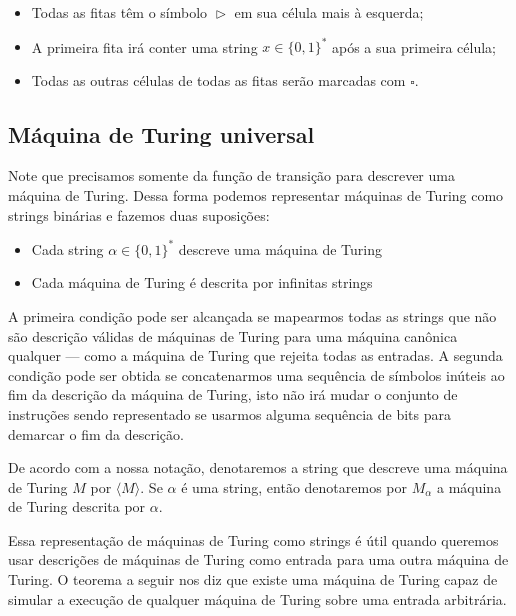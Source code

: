 \begin{itemize}

\item Todas as fitas têm o símbolo $\vartriangleright$ em sua célula mais à esquerda;

\item A primeira fita irá conter uma string $x \in \{0, 1\}^{*}$ após a sua primeira célula;

\item Todas as outras células de todas as fitas serão marcadas com $\square$.

\end{itemize}


\subsection{Máquina de Turing universal}

Note que precisamos somente da função de transição para descrever uma máquina de Turing. Dessa forma podemos representar máquinas de Turing como strings binárias e fazemos duas suposições:

\begin{itemize}

\item Cada string $\alpha \in \{0, 1\}^{*}$ descreve uma máquina de Turing

\item Cada máquina de Turing é descrita por infinitas strings

\end{itemize}

A primeira condição pode ser alcançada se mapearmos todas as strings que não são descrição válidas de máquinas de Turing para uma máquina canônica qualquer --- como a máquina de Turing que rejeita todas as entradas. A segunda condição pode ser obtida se concatenarmos uma sequência de símbolos inúteis ao fim da descrição da máquina de Turing, isto não irá mudar o conjunto de instruções sendo representado se usarmos alguma sequência de bits para demarcar o fim da descrição.

De acordo com a nossa notação, denotaremos a string que descreve uma máquina de Turing $M$ por $\langle M \rangle$. Se $\alpha$ é uma string, então denotaremos por $M_{\alpha}$ a máquina de Turing descrita por $\alpha$.

Essa representação de máquinas de Turing como strings é útil quando queremos usar descrições de máquinas de Turing como entrada para uma outra máquina de Turing. O teorema a seguir nos diz que existe uma máquina de Turing capaz de simular a execução de qualquer máquina de Turing sobre uma entrada arbitrária.

